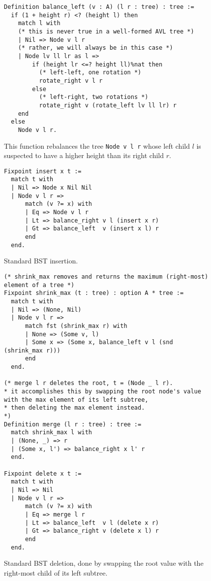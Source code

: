 \documentclass[acmsmall, authorversion, nonacm, overload]{acmart}
\begin{document}
\begin{figure}[h!]
\begin{verbatim}
Definition balance_left (v : A) (l r : tree) : tree :=
  if (1 + height r) <? (height l) then
    match l with
    (* this is never true in a well-formed AVL tree *)
    | Nil => Node v l r
    (* rather, we will always be in this case *)
    | Node lv ll lr as l =>
        if (height lr <=? height ll)%nat then
          (* left-left, one rotation *)
          rotate_right v l r
        else
          (* left-right, two rotations *)
          rotate_right v (rotate_left lv ll lr) r
    end
  else
    Node v l r.
\end{verbatim}
  \caption*{This function rebalances the tree \texttt{Node v l r} whose left child $l$ is suspected
    to have a higher height than its right child $r$.
  }
\end{figure}

\begin{figure}[h!]
\begin{verbatim}
Fixpoint insert x t :=
  match t with
  | Nil => Node x Nil Nil
  | Node v l r =>
      match (v ?= x) with
      | Eq => Node v l r
      | Lt => balance_right v l (insert x r)
      | Gt => balance_left  v (insert x l) r
      end
  end.
\end{verbatim}
\caption*{Standard BST insertion.}
\end{figure}

\begin{figure}[h!]
\begin{verbatim}
(* shrink_max removes and returns the maximum (right-most) element of a tree *)
Fixpoint shrink_max (t : tree) : option A * tree :=
  match t with
  | Nil => (None, Nil)
  | Node v l r =>
      match fst (shrink_max r) with
      | None => (Some v, l)
      | Some x => (Some x, balance_left v l (snd (shrink_max r)))
      end
  end.

(* merge l r deletes the root, t = (Node _ l r).
* it accomplishes this by swapping the root node's value with the max element of its left subtree,
* then deleting the max element instead.
*)
Definition merge (l r : tree) : tree :=
  match shrink_max l with
  | (None, _) => r
  | (Some x, l') => balance_right x l' r
  end.

Fixpoint delete x t :=
  match t with
  | Nil => Nil
  | Node v l r =>
      match (v ?= x) with
      | Eq => merge l r
      | Lt => balance_left  v l (delete x r)
      | Gt => balance_right v (delete x l) r
      end
  end.
\end{verbatim}
  \caption*{Standard BST deletion, done by swapping the root value with the right-most child
    of its left subtree.}
\end{figure}
\end{document}

